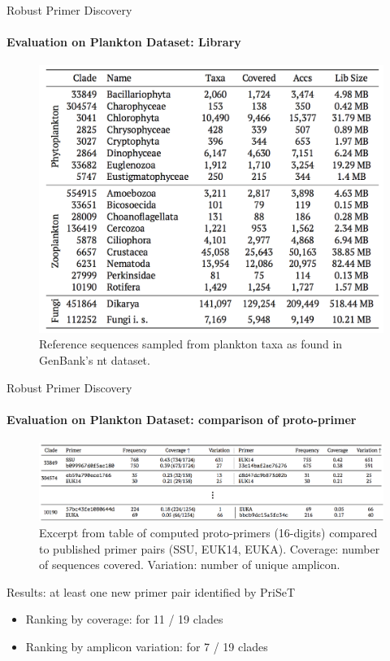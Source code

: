 \documentclass[xcolor=dvipsnames,envcountsect]{beamer}
\begin{document}
\begin{frame}{Robust Primer Discovery}
\framesubtitle{Evaluation on Plankton Dataset: Library}
\begin{figure}
    \includegraphics[scale=.38]{plankton_data}
    \caption{Reference sequences sampled from plankton taxa as found in GenBank's nt dataset.}
\end{figure}
\end{frame}

\begin{frame}{Robust Primer Discovery}
\framesubtitle{Evaluation on Plankton Dataset: comparison of proto-primer}
\begin{figure}\centering
    \includegraphics[scale=.47]{denovo_plankton}
    \caption{Excerpt from table of computed proto-primers (16-digits) compared to published primer pairs (SSU, EUK14, EUKA). Coverage: number of sequences covered. Variation: number of unique amplicon.}
\end{figure}
Results: at least one new primer pair identified by PriSeT
\begin{itemize}
    \item Ranking by coverage: for 11 / 19 clades %
    \item Ranking by amplicon variation: for 7 / 19 clades %
\end{itemize}
\end{frame}
\end{document}
